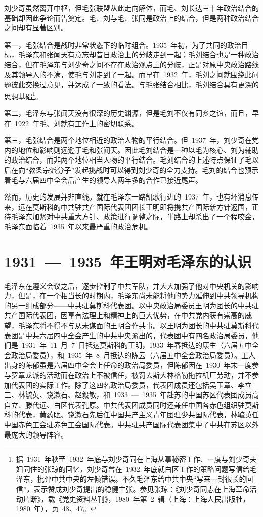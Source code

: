 刘少奇虽然离开中枢，但毛张联盟从此走向解体，而毛、刘长达三十年政治结合的基础却因此争论而告奠定。毛、刘与毛、张同是政治上的结合，但是两种政治结合之间却有显著区别。

第一，毛张结合是战时非常状态下的临时组合。1935~年初，为了共同的政治目标，毛泽东和张闻天有意忘却昔日政治上的分歧走到一起；毛刘结合也是一种政治结合，但在毛泽东与刘少奇之间不存在政治观点上的分歧，正是对原中央政治路线及其领导人的不满，使毛与刘走到了一起。而早在~1932~年，毛刘之间就围绕此问题彼此交换过意见，并达成了一致的看法。与毛张结合相比，毛刘结合具有更深的思想基础\footnote{据~1931~年秋至~1932~年底与刘少奇同在上海从事秘密工作、一度与刘少奇夫妇同住的张琼的回忆，刘少奇曾在~1932~年底就白区工作的策略问题写信给毛泽东，批评中共中央的左倾错误。不久毛泽东给中共中央“写来一封很长的回信”，表示赞成刘少奇提出的稳健主张。参见张琼：《刘少奇同志在上海革命活动片断》，载《党史资料丛刊》，1980~年第~2~辑（上海：上海人民出版社，1980~年），页~48、47。}。

第二，毛泽东与张闻天没有很深的历史渊源，但是毛刘不仅有同乡之谊，而且，早在~1922~年毛、刘就有工作上的密切联系。

第三，毛张结合是两个地位相近的政治人物的平行结合。但~1937~年，刘少奇在党内的地位和影响则远逊于毛和张闻天。因此毛刘结合是一种以毛为核心、刘为辅助的政治结合，而非两个地位相当人物的平行结合。毛刘结合的上述特点保证了毛以后在向“教条宗派分子”发起挑战时可以得到刘少奇的全力支持。毛刘的结合也预示着毛与六届四中全会后产生的领导人两年多的合作已接近尾声。

然而，历史的发展并非直线。就在毛泽东一路凯歌行进的~1937~年，也有坏消息传来，远在莫斯科的中共驻共产国际代表团团长王明即将携共产国际新方针返国，正待毛泽东加紧对中共重大方针、政策进行调整之际，半路上却杀出了一个程咬金，毛泽东面临着~1935~年以来最严重的政治危机。

\section{1931~—~1935~年王明对毛泽东的认识}

毛泽东在遵义会议之后，逐步控制了中共军队，并大大加强了他对中央机关的影响力，但是，在一个相当长的时期内，毛泽东尚未能将他的势力延伸到中共领导机构的另一组成部分——中共驻莫斯科代表团。以中央政治局委员王明为团长的中共驻共产国际代表团，因享有法理上和精神上的巨大优势，在中共党内获有崇高的威望，毛泽东将不得不与从未谋面的王明合作共事。以王明为团长的中共驻莫斯科代表团是中共六届四中全会产生的中共中央派出的，代表团中有四名政治局委员，他们是~1931~年~11~月~7~日抵达莫斯科的王明，1933~年春抵达的康生（六届五中全会政治局委员），和~1935~年~8~月抵达的陈云（六届五中全会政治局委员）。工人出身的陈郁虽是六届四中全会上任命的政治局委员，但陈郁因在~1930~年末一度参与罗章龙派的活动而在政治上不被信任，被罚去斯大林格勒拖拉机厂劳动，并不参加代表团的实际工作。除了这四名政治局委员，代表团成员还包括吴玉章、李立三、林毓英、饶漱石、赵毅敏，和~1933~—~1935~年赴苏的中国苏区代表团成员高自立、滕代远、白区代表孔原。中共代表团成员同时还兼任中国各赤色组织驻莫斯科的代表，黄药眠、饶漱石先后任中国共产主义青年团驻少共国际代表，林毓英任中国赤色工会驻赤色工会国际代表。中共驻共产国际代表团集中了中共在苏区以外最庞大的领导阵容。

